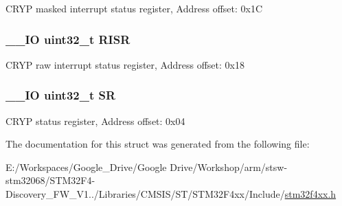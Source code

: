 C\-R\-Y\-P masked interrupt status register, Address offset\-: 0x1\-C \hypertarget{struct_c_r_y_p___type_def_aa196fddf0ba7d6e3ce29bdb04eb38b94}{
\subsubsection[{R\-I\-S\-R}]{\setlength{\rightskip}{0pt plus 5cm}\-\_\-\-\_\-\-I\-O uint32\-\_\-t R\-I\-S\-R}}\label{struct_c_r_y_p___type_def_aa196fddf0ba7d6e3ce29bdb04eb38b94}
C\-R\-Y\-P raw interrupt status register, Address offset\-: 0x18 \hypertarget{struct_c_r_y_p___type_def_af6aca2bbd40c0fb6df7c3aebe224a360}{
\subsubsection[{S\-R}]{\setlength{\rightskip}{0pt plus 5cm}\-\_\-\-\_\-\-I\-O uint32\-\_\-t S\-R}}\label{struct_c_r_y_p___type_def_af6aca2bbd40c0fb6df7c3aebe224a360}
C\-R\-Y\-P status register, Address offset\-: 0x04 

The documentation for this struct was generated from the following file\-:\begin{DoxyCompactItemize}
\item 
E\-:/\-Workspaces/\-Google\-\_\-\-Drive/\-Google Drive/\-Workshop/arm/stsw-\/stm32068/\-S\-T\-M32\-F4-\/\-Discovery\-\_\-\-F\-W\-\_\-\-V1../\-Libraries/\-C\-M\-S\-I\-S/\-S\-T/\-S\-T\-M32\-F4xx/\-Include/\hyperlink{stm32f4xx_8h}{stm32f4xx.\-h}\end{DoxyCompactItemize}
